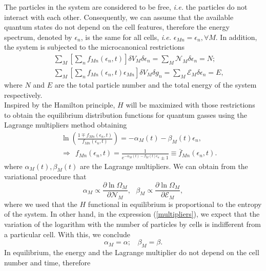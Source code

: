 \documentclass{article}
\begin{document}
The particles in the system are considered to be free, \textit{i.e.} the particles do not interact with each other.
Consequently, we can assume that the available quantum states do not depend on the cell features,
therefore the energy spectrum, denoted by $\epsilon_n$, is the same for all cells, \textit{i.e.} $\epsilon_{Mn} = \epsilon_n, \forall M$. In addition, the system is subjected to the microcanonical restrictions
\begin{eqnarray}
    &&\sum_{M} \left[ \sum_{n}f_{Mn}(\epsilon_{n} ,t)\right]\delta V_M \delta \epsilon_n=\sum_{M} {\mathcal{N}}_{M} \delta \epsilon_n=N; \nonumber \\
    &&\sum_{M}\left[ \sum_{n}f_{Mn}(\epsilon_{n},t)\epsilon_{Mn}\right]\delta V_M \delta g_n=\sum_M {\mathcal{E}}_M \delta \epsilon_n=E, \label{restriccions1}
\end{eqnarray}
where $N$ and $E$ are the total particle number and the total energy of the system respectively.\\ 
Inspired by the Hamilton principle, $H$ will be maximized with those restrictions to obtain the equilibrium distribution functions for quantum gasses using the Lagrange multipliers method obtaining
\begin{eqnarray}
&&\ln \left(\frac{1\mp f_{Mn}(\epsilon_{n},t)}{f_{Mn}(\epsilon_{n},t)} \right)=-\alpha_M(t)-\beta_M(t) \epsilon_{n}, \label{relation}\\ &&\Rightarrow \ \ f_{Mn}(\epsilon_{n},t)=\frac{1}{e^{-\alpha_M(t)-\beta_M(t) \epsilon_{n}}\pm 1} \equiv \bar{f}_{Mn}(\epsilon_{n},t) \label{distributionequilibrium}.
\end{eqnarray}
where $\alpha_M(t), \beta_M(t)$ are the Lagrange multipliers. We can obtain from the variational procedure that 
\begin{equation}
    \alpha_M\propto \frac{\partial \ln \Omega_M}{\partial \mathcal{N}_M}, \ \ \ \beta_M\propto \frac{\partial \ln \Omega_M}{\partial \mathcal{E}_M},\label{multipliers}
\end{equation}
where we used that the $H$ functional in equilibrium is proportional to the entropy of the system.
In other hand, in the expression (\ref{multipliers}), we expect that the variation of the logarithm with the number of particles by cells is indifferent from a particular cell. With this, we conclude  
\begin{equation}
    \alpha_M=\alpha; \ \ \ \ \beta_M=\beta.
\end{equation}
In equilibrium, the energy and the Lagrange multiplier do not depend on the cell number and time, therefore
\end{document}
